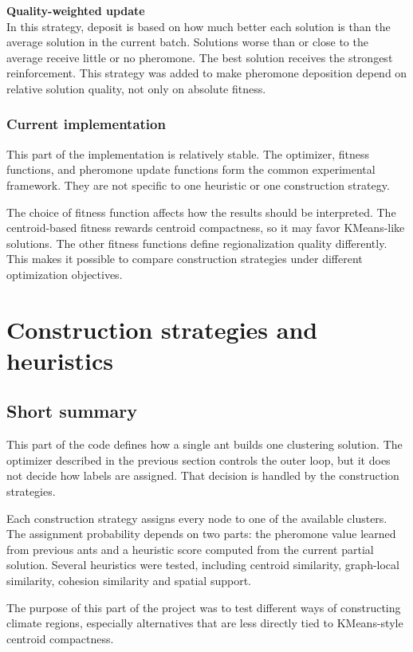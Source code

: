 \documentclass[11pt]{article}
\begin{document}
\textbf{Quality-weighted update} \\
In this strategy, deposit is based on how much better each solution is than the average solution in the current batch. Solutions worse than or close to the average receive little or no pheromone. The best solution receives the strongest reinforcement. This strategy was added to make pheromone deposition depend on relative solution quality, not only on absolute fitness.


\subsubsection{Current implementation}
This part of the implementation is relatively stable. The optimizer, fitness functions, and pheromone update functions form the common experimental framework. They are not specific to one heuristic or one construction strategy.

The choice of fitness function affects how the results should be interpreted. The centroid-based fitness rewards centroid compactness, so it may favor KMeans-like solutions. The other fitness functions define regionalization quality differently. This makes it possible to compare construction strategies under different optimization objectives.

\section{Construction strategies and heuristics}
\label{sec:strategies}

\subsection{Short summary}
This part of the code defines how a single ant builds one clustering solution. The optimizer described in the previous section controls the outer loop, but it does not decide how labels are assigned. That decision is handled by the construction strategies.

Each construction strategy assigns every node to one of the available clusters. The assignment probability depends on two parts: the pheromone value learned from previous ants and a heuristic score computed from the current partial solution. Several heuristics were tested, including centroid similarity, graph-local similarity, cohesion similarity and spatial support.

The purpose of this part of the project was to test different ways of constructing climate regions, especially alternatives that are less directly tied to KMeans-style centroid compactness.
\end{document}
